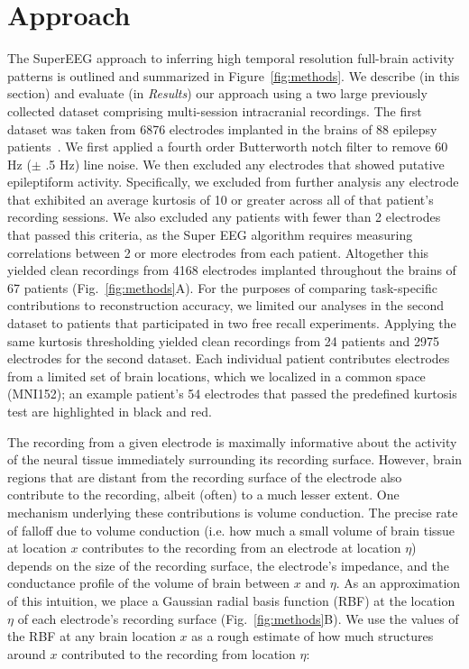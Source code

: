 \documentclass[12pt]{article}
\begin{document}
\section*{Approach}
The SuperEEG approach to inferring high temporal resolution full-brain activity patterns is outlined and summarized in
Figure~\ref{fig:methods}. We describe (in this section) and evaluate
(in \textit{Results}) our approach using a two large previously collected
dataset comprising multi-session intracranial recordings.  The first dataset was taken from
6876 electrodes implanted in the brains of 88 epilepsy
patients~\cite{SedeEtal03, SedeEtal07a, SedeEtal07b, MannEtal11,
  MannEtal12}.  We first applied a fourth order Butterworth notch filter to remove
60 Hz ($\pm$ .5 Hz) line noise.  We then excluded any electrodes that
showed putative epileptiform activity.  Specifically, we excluded from
further analysis any electrode that exhibited an average kurtosis of
10 or greater across all of that patient's recording sessions.  We
also excluded any patients with fewer than 2 electrodes that passed
this criteria, as the Super EEG algorithm requires measuring
correlations between 2 or more electrodes from each patient.
Altogether this yielded clean recordings from 4168 electrodes
implanted throughout the brains of 67 patients (Fig.~\ref{fig:methods}A). For the purposes of comparing task-specific contributions to reconstruction accuracy, we limited our analyses in the second dataset to patients that participated in two free recall experiments.  Applying the same kurtosis thresholding yielded clean recordings from 24 patients and 2975 electrodes for the second dataset. Each individual patient contributes
electrodes from a limited set of brain locations, which we localized
in a common space (MNI152); an example patient's 54 electrodes that
passed the predefined kurtosis test are highlighted in black and red.


The recording from a given electrode is maximally informative about
the activity of the neural tissue immediately surrounding its
recording surface.  However, brain regions that are distant from the
recording surface of the electrode also contribute to the recording,
albeit (often) to a much lesser extent.  One mechanism underlying these
contributions is volume conduction.  The precise rate of falloff due
to volume conduction (i.e. how much a small volume of brain tissue at
location $x$ contributes to the recording from an electrode at
location $\eta$) depends on the size of the recording surface, the
electrode's impedance, and the conductance profile of the volume of
brain between $x$ and $\eta$.  As an approximation of this intuition,
we place a Gaussian radial basis function (RBF) at the location $\eta$
of each electrode's recording surface (Fig.~\ref{fig:methods}B).  We
use the values of the RBF at any brain location $x$ as a rough
estimate of how much structures around $x$ contributed to the
recording from location $\eta$:
\end{document}
